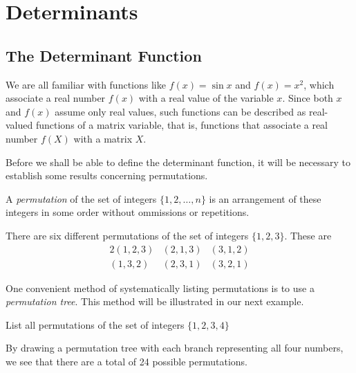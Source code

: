 
\chapter{Determinants}

\section{The Determinant Function}

We are all familiar with functions like $f(x) = \sin x$ and $f(x)=x^2$,
which associate a real number $f(x)$ with a real value of the variable
$x$.  Since both $x$ and $f(x)$ assume only real values, such functions
can be described as real-valued functions of a matrix variable, that is,
functions that associate a real number $f(X)$ with a matrix $X$.

Before we shall be able to define the determinant function, it will be
necessary to establish some results concerning permutations.

\begin{definition}
A {\it permutation} of the set of integers $\{1,2,\ldots,n\}$ is an
arrangement of these integers in some order without ommissions or
repetitions.
\end{definition}

\begin{example}
There are six different permutations of the set of integers $\{1,2,3\}$.
These are
%
\begin{alignat}{2}
 (1,2,3) & (2,1,3) & (3,1,2) \\
 (1,3,2) & (2,3,1) & (3,2,1)
\end{alignat}
\end{example}

One convenient method of systematically listing permutations is to use a
{\it permutation tree}.  This method will be illustrated in our next
example.

\begin{example}
List all permutations of the set of integers $\{1,2,3,4\}$

%
%
%
%

\quad
By drawing a permutation tree with each branch representing all four
numbers, we see that there are a total of 24 possible permutations.
\end{example}


